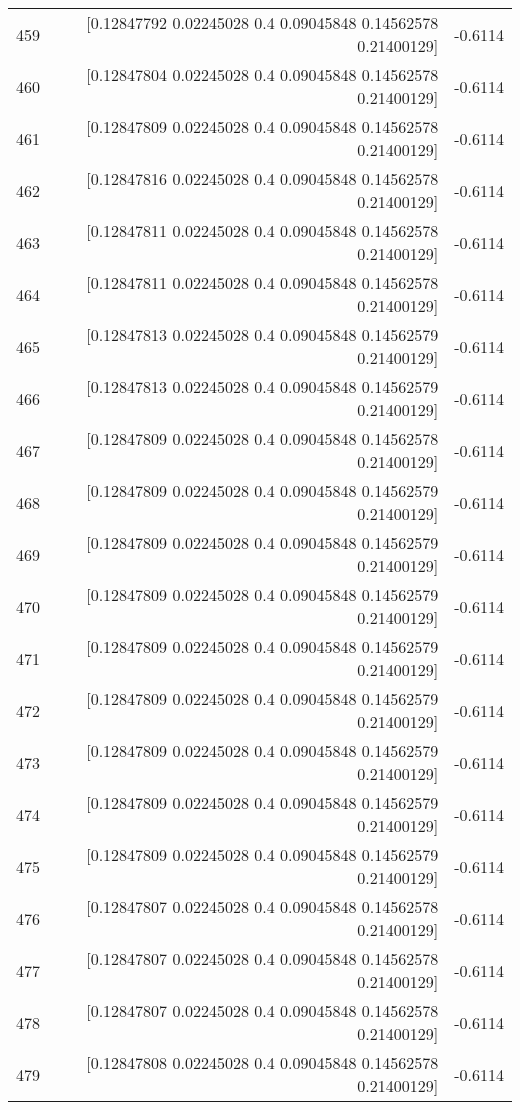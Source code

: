 \begin{longtable}{lrr}
459 & [0.12847792 0.02245028 0.4        0.09045848 0.14562578 0.21400129] & -0.6114 \\
460 & [0.12847804 0.02245028 0.4        0.09045848 0.14562578 0.21400129] & -0.6114 \\
461 & [0.12847809 0.02245028 0.4        0.09045848 0.14562578 0.21400129] & -0.6114 \\
462 & [0.12847816 0.02245028 0.4        0.09045848 0.14562578 0.21400129] & -0.6114 \\
463 & [0.12847811 0.02245028 0.4        0.09045848 0.14562578 0.21400129] & -0.6114 \\
464 & [0.12847811 0.02245028 0.4        0.09045848 0.14562578 0.21400129] & -0.6114 \\
465 & [0.12847813 0.02245028 0.4        0.09045848 0.14562579 0.21400129] & -0.6114 \\
466 & [0.12847813 0.02245028 0.4        0.09045848 0.14562579 0.21400129] & -0.6114 \\
467 & [0.12847809 0.02245028 0.4        0.09045848 0.14562578 0.21400129] & -0.6114 \\
468 & [0.12847809 0.02245028 0.4        0.09045848 0.14562579 0.21400129] & -0.6114 \\
469 & [0.12847809 0.02245028 0.4        0.09045848 0.14562579 0.21400129] & -0.6114 \\
470 & [0.12847809 0.02245028 0.4        0.09045848 0.14562579 0.21400129] & -0.6114 \\
471 & [0.12847809 0.02245028 0.4        0.09045848 0.14562579 0.21400129] & -0.6114 \\
472 & [0.12847809 0.02245028 0.4        0.09045848 0.14562579 0.21400129] & -0.6114 \\
473 & [0.12847809 0.02245028 0.4        0.09045848 0.14562579 0.21400129] & -0.6114 \\
474 & [0.12847809 0.02245028 0.4        0.09045848 0.14562579 0.21400129] & -0.6114 \\
475 & [0.12847809 0.02245028 0.4        0.09045848 0.14562579 0.21400129] & -0.6114 \\
476 & [0.12847807 0.02245028 0.4        0.09045848 0.14562578 0.21400129] & -0.6114 \\
477 & [0.12847807 0.02245028 0.4        0.09045848 0.14562578 0.21400129] & -0.6114 \\
478 & [0.12847807 0.02245028 0.4        0.09045848 0.14562578 0.21400129] & -0.6114 \\
479 & [0.12847808 0.02245028 0.4        0.09045848 0.14562578 0.21400129] & -0.6114 \\

\end{longtable}
